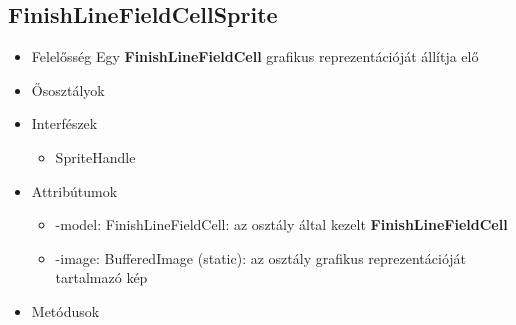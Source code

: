 \subsection{FinishLineFieldCellSprite}
\begin{itemize}
\item Felelősség \newline
    Egy \textbf{FinishLineFieldCell} grafikus reprezentációját állítja elő
\item Ősosztályok
\item Interfészek
    \begin{itemize}
        \item SpriteHandle
    \end{itemize}
\item Attribútumok
    \begin{itemize}
        \item -model: FinishLineFieldCell: az osztály által kezelt \textbf{FinishLineFieldCell}
        \item -image: BufferedImage (static): az osztály grafikus reprezentációját tartalmazó kép
    \end{itemize}
\item Metódusok
\end{itemize}

